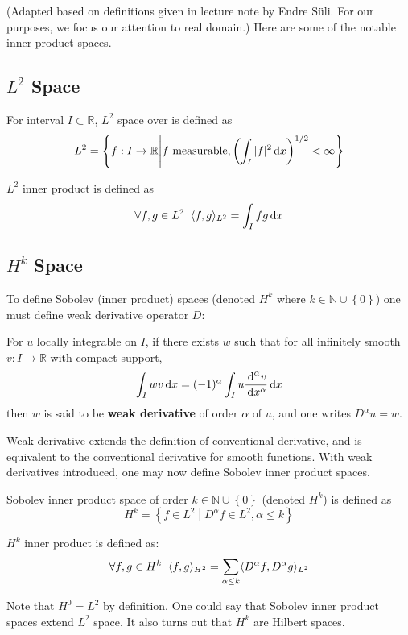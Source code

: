 \documentclass[../dissertation.tex]{subfiles}
\begin{document}
(Adapted based on definitions given in lecture note by Endre S\"uli\cite{nspde}.
For our purposes, we focus our attention to real domain.)
Here are some of the notable inner product spaces.
\subsection{$L^2$ Space}
\begin{definition}[$L^2$ Space]
    For interval $I \subset \mathbb{R}$,
    $L^2$ space over is defined as
    \begin{equation}
        L^2 = \left\{ f:I \rightarrow \mathbb{R} \middle| f \text{ measurable}, \left( \int_{I} |f|^2 \, \text{d} x \right)^{1/2} < \infty  \right\}
    \end{equation}

    $L^2$ inner product is defined as
    \begin{equation}
        \forall f,g \in L^2 \; \; \langle f, g \rangle_{L^2} = \int_I f g \, \text{d} x
    \end{equation}
\end{definition}

\subsection{$H^k$ Space}
To define Sobolev (inner product) spaces (denoted $H^k$ where $k \in \mathbb{N} \cup \left\{ 0 \right\}$)
one must define weak derivative operator $D$:
\begin{definition}
    For $u$ locally integrable on $I$, if there exists $w$ such that for all infinitely smooth $v:I \rightarrow \mathbb{R}$ with compact support,
    \begin{equation}
        \int_{I} w v \, \text{d} x = (-1)^{\alpha} \int_{I} u \frac{\, \text{d}^{\alpha} v}{\, \text{d} x^{\alpha}} \, \text{d} x
    \end{equation}
    then $w$ is said to be \textbf{weak derivative} of order $\alpha$ of $u$, and one writes $D^{\alpha}u = w$.
\end{definition}

Weak derivative extends the definition of conventional derivative, and is equivalent to the conventional derivative for smooth functions.
With weak derivatives introduced, one may now define Sobolev inner product spaces.
\begin{definition}[$H^k$ Space]
    Sobolev inner product space of order $k \in \mathbb{N} \cup \left\{ 0 \right\}$ (denoted $H^k$) is defined as
    \begin{equation}
        H^k = \left\{ f \in L^2 \left.\middle|\right. D^{\alpha} f \in L^2, \alpha \leq k \right\}
    \end{equation}

    $H^k$ inner product is defined as:
    \begin{equation}
        \forall f,g \in H^{k} \; \; \langle f, g \rangle_{H^2} = \sum_{\alpha \leq k} \langle D^\alpha f, D^\alpha g \rangle_{L^2}
    \end{equation}
\end{definition}

\begin{remark}
    Note that $H^0 = L^2$ by definition.
    One could say that Sobolev inner product spaces extend $L^2$ space.
    It also turns out that $H^k$ are Hilbert spaces.
\end{remark}
\end{document}
